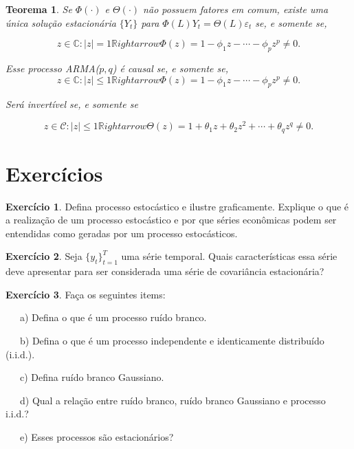 \documentclass[
]{book}
\newtheorem{theorem}{Teorema}[chapter]
\theoremstyle{definition}
\theoremstyle{definition}
\theoremstyle{definition}
\newtheorem{exercise}{Exercício}[chapter]
\theoremstyle{remark}
\begin{document}
\begin{theorem}
\protect\hypertarget{thm:causaarma}{}{\label{thm:causaarma} }Se \(\Phi(\cdot)\) e \(\Theta(\cdot)\) não possuem fatores em comum, existe
uma única solução estacionária \(\{Y_t\}\) para \(\Phi(L)Y_t = \Theta(L)\varepsilon_t\)
se, e somente se,

\begin{equation*}
z\in\mathbb{C} : |z| = 1 \mathbb{R}ightarrow \Phi(z) = 1 - \phi_1 z - \cdots - \phi_p z^p \neq 0.
\end{equation*}

Esse processo ARMA(\(p,q\)) é causal se, e somente se,
\begin{equation*}
z\in\mathbb{C} : |z| \leq 1 \mathbb{R}ightarrow \Phi(z) = 1 - \phi_1 z - \cdots - \phi_p z^p \neq 0.
\end{equation*}

Será invertível se, e somente se

\begin{equation*}
z\in\mathcal{C} : |z|\leq  1 \mathbb{R}ightarrow \Theta(z) = 1 + \theta_1 z +\theta_2 z^2+\cdots+\theta_q z^q\neq 0.
\end{equation*}
\end{theorem}

\hypertarget{exercuxedcios}{%
\section{Exercícios}\label{exercuxedcios}}

\begin{exercise}
\protect\hypertarget{exr:pest}{}{\label{exr:pest} }Defina processo estocástico e ilustre graficamente. Explique o que é a realização de um processo estocástico e por que séries econômicas podem ser entendidas como geradas por um processo estocásticos.
\end{exercise}

\begin{exercise}
\protect\hypertarget{exr:stce}{}{\label{exr:stce} } Seja \(\{y_t\}^T_{t=1}\) uma série temporal. Quais características essa série deve apresentar para ser considerada uma série de covariância estacionária?
\end{exercise}

\begin{exercise}
\protect\hypertarget{exr:defrb}{}{\label{exr:defrb} }Faça os seguintes items:

~~~a) Defina o que é um processo ruído branco.

~~~b) Defina o que é um processo independente e identicamente distribuído (i.i.d.).

~~~c) Defina ruído branco Gaussiano.

~~~d) Qual a relação entre ruído branco, ruído branco Gaussiano e processo i.i.d.?

~~~e) Esses processos são estacionários?
\end{exercise}
\end{document}
